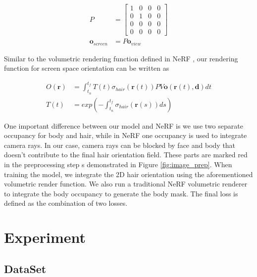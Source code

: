 \documentclass[12pt]{article}
\begin{document}
\begin{align}
	P                   & = \begin{bmatrix}
		                        1 & 0 & 0 & 0 \\
		                        0 & 1 & 0 & 0 \\
		                        0 & 0 & 0 & 0 \\
		                        0 & 0 & 0 & 0
	                        \end{bmatrix}     \\
	\mathbf{o}_{screen} & = P\mathbf{o}_{view}
\end{align}

Similar to the volumetric rendering function defined in NeRF \cite{mildenhall_nerf_2020}, our rendering function for screen space orientation can be written as

\begin{align}
	O(\mathbf{r}) & = \int_{t_{n}}^{t_{f}} T(t) \sigma_{hair}(\mathbf{r}(t)) P V \mathbf{o}(\mathbf{r}(t), \mathbf{d}) dt \\
	T(t)          & = exp(-\int_{t_{n}}^{t_{f}} \sigma_{hair}(\mathbf{r}(s)) ds)
\end{align}

One important difference between our model and NeRF is we use two separate occupancy for body and hair, while in NeRF one occupancy is used to integrate camera rays. In our case, camera rays can be blocked by face and body that doesn't contribute to the final hair orientation field. These parts are marked red in the preprocessing step s demonstrated in Figure \ref{fig:image_prep}. When training the model, we integrate the 2D hair orientation using the aforementioned volumetric render function. We also run a traditional NeRF volumetric renderer to integrate the body occupancy to generate the body mask. The final loss is defined as the combination of two losses.

\section{Experiment}

\subsection{DataSet}
\end{document}

